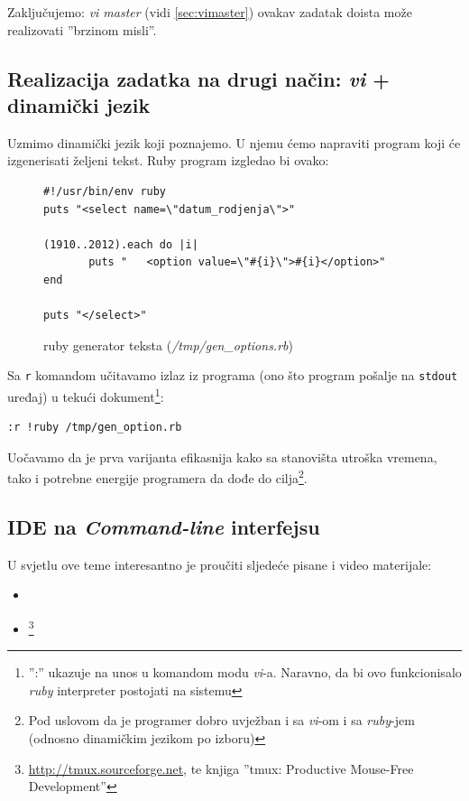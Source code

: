 \documentclass[times, utf8, seminar]{fit}
\begin{document}
Zaključujemo: \emph{vi master} (vidi \ref{sec:vimaster}) ovakav zadatak doista može realizovati ''brzinom misli''.

\subsection{Realizacija zadatka na drugi način: \emph{vi} + dinamički jezik}

Uzmimo dinamički jezik koji poznajemo. U njemu ćemo napraviti program koji će izgenerisati željeni tekst. Ruby program izgledao bi ovako:

\begin{figure}[H]
\begin{lstlisting}
#!/usr/bin/env ruby
puts "<select name=\"datum_rodjenja\">"

(1910..2012).each do |i|
       puts "   <option value=\"#{i}\">#{i}</option>"	
end

puts "</select>"
\end{lstlisting}
\caption{ruby generator teksta (\emph{/tmp/gen\_options.rb})}
\end{figure}

Sa \verb+r+ komandom učitavamo izlaz iz programa (ono što program pošalje na \verb+stdout+ uređaj) u tekući dokument\footnote{'':'' ukazuje na unos u komandom modu \emph{vi}-a.  Naravno, da bi ovo funkcionisalo \emph{ruby} interpreter postojati na sistemu}:

\begin{lstlisting}
:r !ruby /tmp/gen_option.rb
\end{lstlisting}

Uočavamo da je prva varijanta efikasnija kako sa stanovišta utroška vremena, tako i potrebne energije programera da dođe do cilja\footnote{Pod uslovom da je programer dobro uvježban i sa \emph{vi}-om i sa \emph{ruby}-jem (odnosno dinamičkim jezikom po izboru)}.

\subsection{IDE na \emph{Command-line} interfejsu}

U svjetlu ove teme interesantno je proučiti sljedeće pisane i video materijale:
\begin{itemize}
 \item  \href{http://blog.sanctum.geek.nz/series/unix-as-ide}{\color{blue}{Unix kao IDE}}
 \item \href{http://www.youtube.com/watch?v=za8FMIWYtUc}{}\footnote{\url{http://tmux.sourceforge.net}, te knjiga ''tmux: Productive Mouse-Free Development''\citep{pragtmux}}
\end{itemize}
\end{document}
